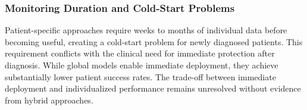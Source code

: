 \subsubsection{Monitoring Duration and Cold-Start Problems}

Patient-specific approaches require weeks to months of individual data before becoming useful, creating a cold-start problem for newly diagnosed patients. This requirement conflicts with the clinical need for immediate protection after diagnosis. While global models enable immediate deployment, they achieve substantially lower patient success rates. The trade-off between immediate deployment and individualized performance remains unresolved without evidence from hybrid approaches.
